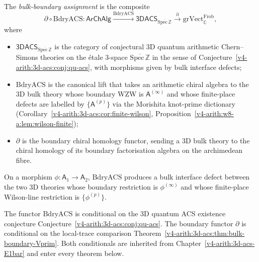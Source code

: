 \begin{definition}
\label{v4-arith:w9-r5:def:functor-bdryACS}
The \emph{bulk-boundary assignment} is the composite
\begin{equation}
\label{v4-arith:w9-r5:eq:functor-bdryACS}
\partial\circ\mathrm{BdryACS}\colon
\mathsf{ArChAlg}
\xrightarrow{\mathrm{BdryACS}}
\mathsf{3DACS}_{\overline{\mathrm{Spec}\,\mathbb{Z}}}
\xrightarrow{\partial}
\mathrm{grVect}_{\mathbb{C}}^{\mathrm{Frob}},
\end{equation}
where
\begin{itemize}
\item \(\mathsf{3DACS}_{\overline{\mathrm{Spec}\,\mathbb{Z}}}\) is the
category of conjectural 3D quantum arithmetic Chern--Simons theories
on the \'etale 3-space \(\overline{\mathrm{Spec}\,\mathbb{Z}}\) in the
sense of Conjecture~\ref{v4-arith:3d-acs:conj:qu-acs}, with morphisms given
by bulk interface defects;
\item \(\mathrm{BdryACS}\) is the canonical lift that takes an arithmetic
chiral algebra to the 3D bulk theory whose boundary WZW is
\(\mathsf{A}^{(\infty)}\) and whose finite-place defects are labelled
by \(\{\mathsf{A}^{(p)}\}\) via the Morishita knot-prime dictionary
(Corollary~\ref{v4-arith:3d-acs:cor:finite-wilson},
Proposition~\ref{v4-arith:w8-a:lem:wilson-finite});
\item \(\partial\) is the boundary chiral homology functor, sending a
3D bulk theory to the chiral homology of its boundary factorisation
algebra on the archimedean fibre.
\end{itemize}
On a morphism \(\phi\colon\mathsf{A}_{1}\to\mathsf{A}_{2}\),
\(\mathrm{BdryACS}\) produces a bulk interface defect between the two
3D theories whose boundary restriction is \(\phi^{(\infty)}\) and
whose finite-place Wilson-line restriction is \(\{\phi^{(p)}\}\).
\end{definition}

\begin{remark}
\label{v4-arith:w9-r5:rem:bdryACS-conditional}
The functor \(\mathrm{BdryACS}\) is conditional on the 3D quantum ACS
existence conjecture Conjecture~\ref{v4-arith:3d-acs:conj:qu-acs}. The boundary
functor \(\partial\) is conditional on the local-trace comparison
Theorem~\ref{v4-arith:3d-acs:thm:bulk-boundary-Vprim}. Both conditionals are
inherited from Chapter~\ref{v4-arith:3d-acs-E1bar} and enter every
theorem below.
\end{remark}

